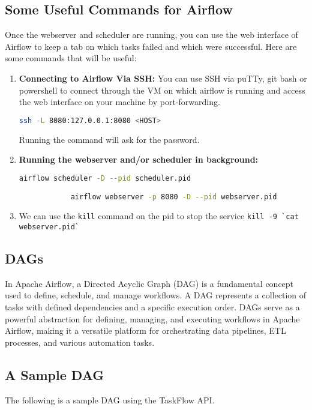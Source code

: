 \subsection{Some Useful Commands for Airflow}

Once the webserver and scheduler are running, you can use the web interface of Airflow to keep a tab on which tasks failed and which were successful. Here are some commands that will be useful:

\begin{enumerate}
  \item \textbf{Connecting to Airflow Via SSH:} You can use SSH via puTTy, git bash or powershell to connect through the VM on which airflow is running and access the web interface on your machine by port-forwarding.
        \begin{lstlisting}[language=bash]
        ssh -L 8080:127.0.0.1:8080 <HOST>   
        \end{lstlisting}
        Running the command will ask for the password.

  \item \textbf{Running the webserver and/or scheduler in background:}
        \begin{lstlisting}[language=bash]
            airflow scheduler -D --pid scheduler.pid

            airflow webserver -p 8080 -D --pid webserver.pid
        \end{lstlisting}
  \item We can use the \verb|kill| command on the pid to stop the service \verb|kill -9 `cat webserver.pid`|
\end{enumerate}

\subsection{DAGs}

In Apache Airflow, a Directed Acyclic Graph (DAG) is a fundamental concept used to define, schedule, and manage workflows. A DAG represents a collection of tasks with defined dependencies and a specific execution order. DAGs serve as a powerful abstraction for defining, managing, and executing workflows in Apache Airflow, making it a versatile platform for orchestrating data pipelines, ETL processes, and various automation tasks.

\subsection{A Sample DAG}
The following is a sample DAG using the TaskFlow API.

